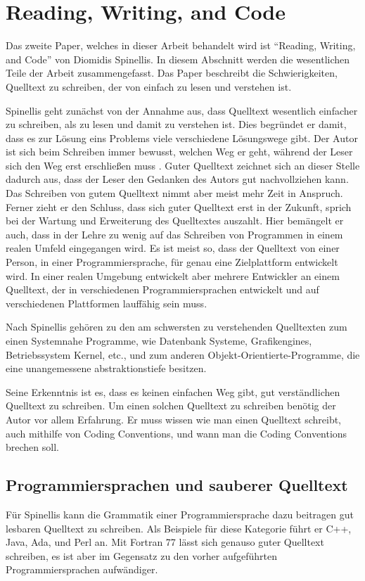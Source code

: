 \section{Reading, Writing, and Code}
Das zweite Paper, welches in dieser Arbeit behandelt wird ist \enquote{Reading, Writing, and Code} von Diomidis Spinellis\cite{Spinellis}. In diesem Abschnitt werden die wesentlichen Teile der Arbeit zusammengefasst. Das Paper beschreibt die Schwierigkeiten, Quelltext zu schreiben, der von einfach zu lesen und verstehen ist. 

Spinellis geht zunächst von der Annahme aus, dass Quelltext wesentlich einfacher zu schreiben, als zu lesen und damit zu verstehen ist. Dies begründet er damit, dass es zur Lösung eins Problems viele verschiedene Lösungswege gibt. Der Autor ist sich beim Schreiben immer bewusst, welchen Weg er geht, während der Leser sich den Weg erst erschließen muss \cite[S. 85]{Spinellis}. Guter Quelltext zeichnet sich an dieser Stelle dadurch aus, dass der Leser den Gedanken des Autors gut nachvollziehen kann. Das Schreiben von gutem Quelltext nimmt aber meist mehr Zeit in Anspruch. Ferner zieht er den Schluss, dass sich guter Quelltext erst in der Zukunft, sprich bei der Wartung und Erweiterung des Quelltextes auszahlt\cite[S. 86]{Spinellis}. Hier bemängelt er auch, dass in der Lehre zu wenig auf das Schreiben von Programmen in einem realen Umfeld eingegangen wird. Es ist meist so, dass der Quelltext von einer Person, in einer Programmiersprache, für genau eine Zielplattform entwickelt wird. In einer realen Umgebung entwickelt aber mehrere Entwickler an einem Quelltext, der in verschiedenen Programmiersprachen entwickelt und auf verschiedenen Plattformen lauffähig sein muss. \cite[S. 86]{Spinellis}

Nach Spinellis gehören zu den am schwersten zu verstehenden Quelltexten zum einen Systemnahe Programme, wie Datenbank Systeme, Grafikengines, Betriebssystem Kernel, etc., und zum anderen Objekt-Orientierte-Programme, die eine unangemessene abstraktionstiefe besitzen. \cite[S. 86]{Spinellis}

Seine Erkenntnis ist es, dass es keinen einfachen Weg gibt, gut verständlichen Quelltext zu schreiben. Um einen solchen Quelltext zu schreiben benötig der Autor vor allem Erfahrung. Er muss wissen wie man einen Quelltext schreibt, auch mithilfe von Coding Conventions, und wann man die Coding Conventions brechen soll. \cite[S. 86]{Spinellis}

\subsection{Programmiersprachen und sauberer Quelltext}
Für Spinellis kann die Grammatik einer Programmiersprache dazu beitragen gut lesbaren Quelltext zu schreiben. Als Beispiele für diese Kategorie führt er C++, Java, Ada, und Perl an. Mit Fortran 77 lässt sich genauso guter Quelltext schreiben, es ist aber im Gegensatz zu den vorher aufgeführten Programmiersprachen aufwändiger. \cite[S. 87]{Spinellis}

